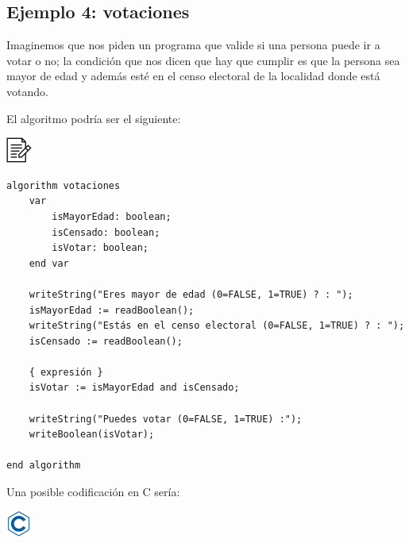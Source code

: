 \documentclass[
]{book}
\begin{document}
\hypertarget{ejemplo-4-votaciones}{%
\subsection{Ejemplo 4: votaciones}\label{ejemplo-4-votaciones}}

Imaginemos que nos piden un programa que valide si una persona puede ir a votar o no; la condición que nos dicen que hay que cumplir es que la persona sea mayor de edad y además esté en el censo electoral de la localidad donde está votando.

El algoritmo podría ser el siguiente:

\includegraphics{./img/alg.png}

\begin{verbatim}
algorithm votaciones
    var
        isMayorEdad: boolean;
        isCensado: boolean;
        isVotar: boolean;
    end var
    
    writeString("Eres mayor de edad (0=FALSE, 1=TRUE) ? : ");
    isMayorEdad := readBoolean();
    writeString("Estás en el censo electoral (0=FALSE, 1=TRUE) ? : ");
    isCensado := readBoolean();
    
    { expresión }
    isVotar := isMayorEdad and isCensado;

    writeString("Puedes votar (0=FALSE, 1=TRUE) :");
    writeBoolean(isVotar);

end algorithm
\end{verbatim}

Una posible codificación en C sería:

\includegraphics{./img/c.png}
\end{document}
